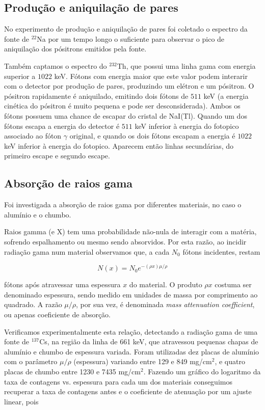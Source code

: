\documentclass[a4paper, 11pt, notitlepage]{article}
\numberwithin{equation}{section}  %
\begin{document}
\subsection{Produção e aniquilação de pares}

No experimento de produção e aniquilação de pares foi coletado o espectro da fonte de ${}^{22}$Na por um tempo longo o suficiente para observar o pico de aniquilação dos pósitrons emitidos pela fonte.

Também captamos o espectro do ${}^{232}$Th, que possui uma linha gama com energia superior a $1022$ keV. Fótons com energia maior que este valor podem interarir com o detector por produção de pares, produzindo um elétron e um pósitron. O pósitron rapidamente é aniquilado, emitindo dois fótons de $511$ keV (a energia cinética do pósitron é muito pequena e pode ser desconsiderada). Ambos os fótons possuem uma chance de escapar do cristal de NaI(Tl). Quando um dos fótons escapa a energia do detector é $511$ keV inferior à energia do fotopico associado ao fóton $\gamma$ original, e quando os dois fótons escapam a energia é $1022$ keV inferior à energia do fotopico. Aparecem então linhas secundárias, do primeiro escape e segundo escape.

\subsection{Absorção de raios gama}

Foi investigada a absorção de raios gama por diferentes materiais, no caso o alumínio e o chumbo. 

Raios gamma (e X) tem uma probabilidade não-nula de interagir com a matéria, sofrendo espalhamento ou mesmo sendo absorvidos. Por esta razão, ao incidir radiação gama num material observamos que, a cada $N_0$ fótons incidentes, restam

$$ N(x) = N_0 e^{-(\rho x) \mu / \rho} $$

\noindent fótons após atravessar uma espessura $x$ do material. O produto $\rho x$ costuma ser denominado espessura, sendo medido em unidades de massa por comprimento ao quadrado. A razão $\mu/\rho$, por sua vez, é denominada \textit{mass attenuation coefficient}, ou apenas coeficiente de absorção.

Verificamos experimentalmente esta relação, detectando a radiação gama de uma fonte de ${}^{137}$Cs, na região da linha de 661 keV, que atravessou pequenas chapas de alumínio e chumbo de espessura variada. Foram utilizadas dez placas de alumínio com o parâmetro $\mu/\rho$ (espessura) variando entre 129 e 849 mg/cm$^{2}$, e quatro placas de chumbo entre 1230 e 7435 mg/cm$^{2}$. Fazendo um gráfico do logaritmo da taxa de contagens vs. espessura para cada um dos materiais conseguimos recuperar a taxa de contagens antes e o coeficiente de atenuação por um ajuste linear, pois
\end{document}
